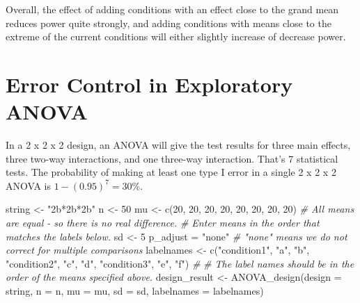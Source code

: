 \documentclass[
]{book}
\newenvironment{Shaded}{\begin{snugshade}}{\end{snugshade}}
\newcommand{\AttributeTok}[1]{\textcolor[rgb]{0.77,0.63,0.00}{#1}}
\newcommand{\CommentTok}[1]{\textcolor[rgb]{0.56,0.35,0.01}{\textit{#1}}}
\newcommand{\DecValTok}[1]{\textcolor[rgb]{0.00,0.00,0.81}{#1}}
\newcommand{\FunctionTok}[1]{\textcolor[rgb]{0.00,0.00,0.00}{#1}}
\newcommand{\NormalTok}[1]{#1}
\newcommand{\OtherTok}[1]{\textcolor[rgb]{0.56,0.35,0.01}{#1}}
\newcommand{\StringTok}[1]{\textcolor[rgb]{0.31,0.60,0.02}{#1}}
\begin{document}
Overall, the effect of adding conditions with an effect close to the grand mean reduces power quite strongly, and adding conditions with means close to the extreme of the current conditions will either slightly increase of decrease power.

\hypertarget{error-control-in-exploratory-anova}{%
\chapter{Error Control in Exploratory ANOVA}\label{error-control-in-exploratory-anova}}

In a 2 x 2 x 2 design, an ANOVA will give the test results for three main effects, three two-way interactions, and one three-way interaction. That's 7 statistical tests. The probability of making at least one type I error in a single 2 x 2 x 2 ANOVA is \(1-(0.95)^7 = 30\)\%.

\begin{Shaded}
\begin{Highlighting}[]
\NormalTok{string }\OtherTok{\textless{}{-}} \StringTok{"2b*2b*2b"}
\NormalTok{n }\OtherTok{\textless{}{-}} \DecValTok{50}
\NormalTok{mu }\OtherTok{\textless{}{-}} \FunctionTok{c}\NormalTok{(}\DecValTok{20}\NormalTok{, }\DecValTok{20}\NormalTok{, }\DecValTok{20}\NormalTok{, }\DecValTok{20}\NormalTok{, }\DecValTok{20}\NormalTok{, }\DecValTok{20}\NormalTok{, }\DecValTok{20}\NormalTok{, }\DecValTok{20}\NormalTok{) }
\CommentTok{\# All means are equal {-} so there is no real difference.}
\CommentTok{\# Enter means in the order that matches the labels below.}
\NormalTok{sd }\OtherTok{\textless{}{-}} \DecValTok{5}
\NormalTok{p\_adjust }\OtherTok{=} \StringTok{"none"}
\CommentTok{\# "none" means we do not correct for multiple comparisons}
\NormalTok{labelnames }\OtherTok{\textless{}{-}} \FunctionTok{c}\NormalTok{(}\StringTok{"condition1"}\NormalTok{, }\StringTok{"a"}\NormalTok{, }\StringTok{"b"}\NormalTok{, }
                \StringTok{"condition2"}\NormalTok{, }\StringTok{"c"}\NormalTok{, }\StringTok{"d"}\NormalTok{, }
                \StringTok{"condition3"}\NormalTok{, }\StringTok{"e"}\NormalTok{, }\StringTok{"f"}\NormalTok{) }\CommentTok{\#}
\CommentTok{\# The label names should be in the order of the means specified above.}
\NormalTok{design\_result }\OtherTok{\textless{}{-}} \FunctionTok{ANOVA\_design}\NormalTok{(}\AttributeTok{design =}\NormalTok{ string,}
                   \AttributeTok{n =}\NormalTok{ n, }
                   \AttributeTok{mu =}\NormalTok{ mu, }
                   \AttributeTok{sd =}\NormalTok{ sd, }
                   \AttributeTok{labelnames =}\NormalTok{ labelnames)}
\end{Highlighting}
\end{Shaded}
\end{document}
